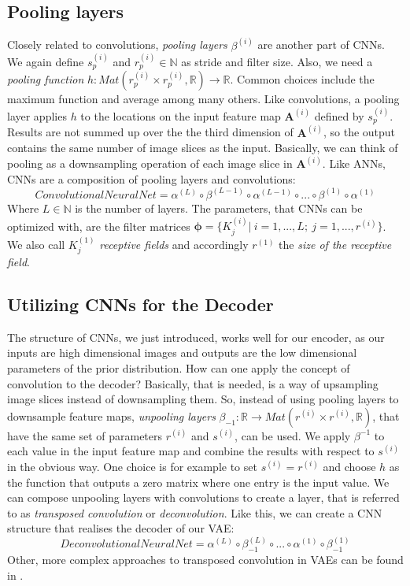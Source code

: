 \documentclass[12pt]{report}
\theoremstyle{definition}
\begin{document}
\subsection{Pooling layers}
Closely related to convolutions, \emph{pooling layers} $\beta^{(i)}$ are another part of CNNs. We again define $s_p^{(i)}$ and $r_p^{(i)}\in \mathbb{N}$ as stride and filter size. Also, we need a \emph{pooling function} $h: Mat(r_p^{(i)} \times r_p^{(i)}, \mathbb{R}) \rightarrow \mathbb{R}$. Common choices include the maximum function and average among many others. Like convolutions, a pooling layer applies $h$ to the locations on the input feature map $\mathbf{A}^{(i)}$ defined by $s_p^{(i)}$. Results are not summed up over the the third dimension of $\mathbf{A}^{(i)}$, so the output contains the same number of image slices as the input. Basically, we can think of pooling as a downsampling operation of each image slice in $\mathbf{A}^{(i)}$.
Like ANNs, CNNs are a composition of pooling layers and convolutions:
\begin{equation}
ConvolutionalNeuralNet = \alpha^{(L)} \circ \beta^{(L-1)} \circ \alpha^{(L-1)} \circ ... \circ \beta^{(1)} \circ \alpha^{(1)}
\end{equation}
Where $L \in \mathbb{N}$ is the number of layers. The parameters, that CNNs can be optimized with, are the filter matrices $\pmb{\phi} = \{ K^{(i)}_j | \ i=1, ..., L; \ j=1, ..., r^{(i)} \}$. We also call $K^{(1)}_j$ \emph{receptive fields} and accordingly $r^{(1)}$ the \emph{size of the receptive field}.

\subsection{Utilizing CNNs for the Decoder}
The structure of CNNs, we just introduced, works well for our encoder, as our inputs are high dimensional images and outputs are the low dimensional parameters of the prior distribution. How can one apply the concept of convolution to the decoder?
Basically, that is needed, is a way of upsampling image slices instead of downsampling them. So, instead of using pooling layers to downsample feature maps, \emph{unpooling layers} $\beta_{-1}: \mathbb{R} \rightarrow Mat(r^{(i)} \times r^{(i)}, \mathbb{R})$, that have the same set of parameters $r^{(i)}$ and $s^{(i)}$, can be used. We apply $\beta^{-1}$ to each value in the input feature map and combine the results with respect to $s^{(i)}$ in the obvious way. One choice is for example to set $s^{(i)} = r^{(i)}$ and choose $h$ as the function that outputs a zero matrix where one entry is the input value. We can compose unpooling layers with convolutions to create a layer, that is referred to as \emph{transposed convolution} or \emph{deconvolution}. Like this, we can create a CNN structure that realises the decoder of our VAE:
\begin{equation}
DeconvolutionalNeuralNet = \alpha^{(L)} \circ \beta^{(L)}_{-1} \circ ... \circ \alpha^{(1)} \circ \beta_{-1}^{(1)}
\end{equation}
Other, more complex approaches to transposed convolution in VAEs can be found in \cite{cvae}.
\end{document}
